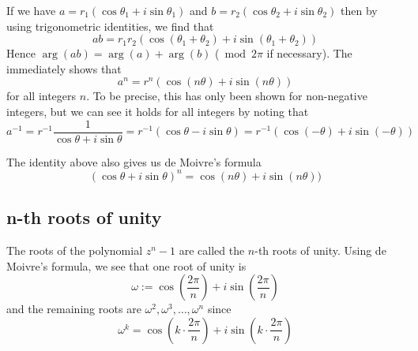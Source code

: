 If we have $a = r_1 (\cos \theta_1 + i \sin \theta_1)$ and $b = r_2(\cos \theta_2 + i \sin \theta_2)$ then by using trigonometric identities, we find that 
$$ab = r_1 r_2 (\cos(\theta_1 + \theta_2) + i \sin(\theta_1 + \theta_2))$$
Hence $\arg(ab) = \arg(a) + \arg(b)$ ($\bmod 2\pi$ if necessary). The immediately shows that 
$$a^n = r^n (\cos(n \theta) + i \sin(n \theta))$$
for all integers $n$. To be precise, this has only been shown for non-negative integers, but we can see it holds for all integers by noting that 
$$ a^{-1} = r^{-1} \frac{1}{\cos \theta + i \sin \theta} = r^{-1}(\cos \theta - i \sin \theta) = r^{-1}(\cos(-\theta) + i \sin(-\theta)) $$

The identity above also gives us de Moivre's formula
$$ (\cos \theta + i \sin \theta)^n = \cos(n \theta) + i \sin (n \theta)) $$

\subsection{n-th roots of unity}
The roots of the polynomial $z^n - 1$ are called the $n$-th roots of unity. Using de Moivre's formula, we see that one root of unity is 
$$\omega := \cos \left( \frac{2\pi}{n} \right) + i \sin \left( \frac{2\pi}{n} \right)$$
and the remaining roots are $\omega^2, \omega^3, \dots, \omega^n$ since 
$$\omega^k = \cos \left( k \cdot \frac{2\pi}{n} \right) + i \sin \left( k \cdot \frac{2\pi}{n} \right)
$$